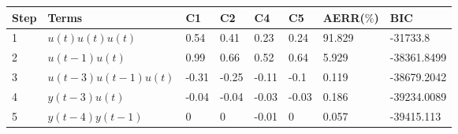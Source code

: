 \begin{tabular}{llllllll}
Step & Terms & C1 & C2 & C4 & C5 & AERR($\%$) & BIC \\ 
\hline 
1 & $u(t)u(t)u(t)$ & 0.54 & 0.41 & 0.23 & 0.24 & 91.829 & -31733.8 \\ 
2 & $u(t-1)u(t)$ & 0.99 & 0.66 & 0.52 & 0.64 & 5.929 & -38361.8499 \\ 
3 & $u(t-3)u(t-1)u(t)$ & -0.31 & -0.25 & -0.11 & -0.1 & 0.119 & -38679.2042 \\ 
4 & $y(t-3)u(t)$ & -0.04 & -0.04 & -0.03 & -0.03 & 0.186 & -39234.0089 \\ 
5 & $y(t-4)y(t-1)$ & 0 & 0 & -0.01 & 0 & 0.057 & -39415.113 \\ 
\hline 
\end{tabular}